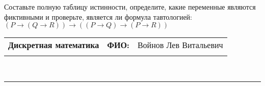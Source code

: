 \documentclass[10pt]{exam}
\newcommand{\class}{Дискретная математика}
\newcommand{\examdate}{}
\begin{document}
\begin{questions}
\begin{enumerate}[a)]
\end{enumerate}\question Составьте полную таблицу истинности, определите, какие переменные являются фиктивными и проверьте, является ли формула тавтологией:
$(P \rightarrow (Q \rightarrow R)) \rightarrow ((P \rightarrow Q) \rightarrow (P \rightarrow R))$

\end{questions}
\newpage
\begin{flushright}
\begin{tabular}{p{2.8in} r l}
\textbf{\class} & \textbf{ФИО:} &Войнов Лев Витальевич
\\

\textbf{\examdate} &&\\
\end{tabular}\\
\end{flushright}
\rule[1ex]{\textwidth}{.1pt}
\end{document}
